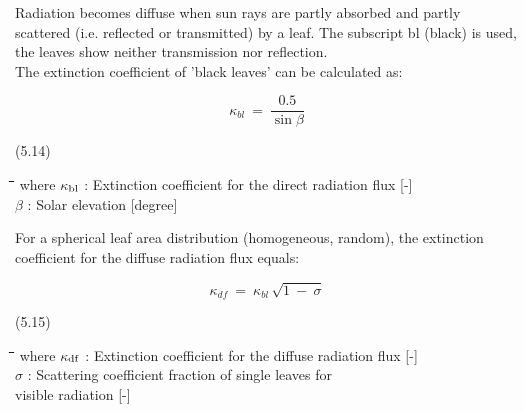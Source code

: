 Radiation becomes diffuse when sun rays are partly absorbed and partly scattered (i.e.
reflected or transmitted) by a leaf. The subscript bl (black) is used, the leaves show
neither transmis\-sion nor reflection. \\
The extinction coefficient of 'black leaves' can be calculat\-ed as:

\begin{displaymath}
\kappa _{bl} ~=~{\frac{0.5}{\sin \beta }}
\end{displaymath}

 
\strut\hfill (5.14)

\nwln
\begin{tabbing}
\hspace{1.27cm}\=\hspace{1.27cm}\=\hspace{1.27cm}\=\hspace{1.27cm}\=%
\hspace{1.27cm}\=\hspace{1.27cm}\=\hspace{1.27cm}\=\hspace{1.27cm}\=%
\hspace{1.27cm}\=\hspace{1.27cm}\=\kill
where $\kappa$$_{{\rm bl}}$ : Extinction coefficient for the direct radiation flux        [-]\\
$\beta$ : Solar elevation        [degree]
\end{tabbing}



For a spherical leaf area distribution (homogeneous, random), the extinction coefficient
for the diffuse radiation flux equals:

\begin{displaymath}
 \kappa _{df} ~=~ \kappa _{bl} \, \sqrt{1~-~ \sigma }
\end{displaymath}

 
\strut\hfill (5.15)
\nwln
\begin{tabbing}
\hspace{1.27cm}\=\hspace{1.27cm}\=\hspace{1.27cm}\=\hspace{1.27cm}\=%
\hspace{1.27cm}\=\hspace{1.27cm}\=\hspace{1.27cm}\=\hspace{1.27cm}\=%
\hspace{1.27cm}\=\hspace{1.27cm}\=\kill
where $\kappa$$_{{\rm df}}$ : Extinction coefficient for the diffuse radiation flux        [-]\\
$\sigma$ : Scattering coefficient fraction of single leaves for \\
   visible radiation        [-]
\end{tabbing}

